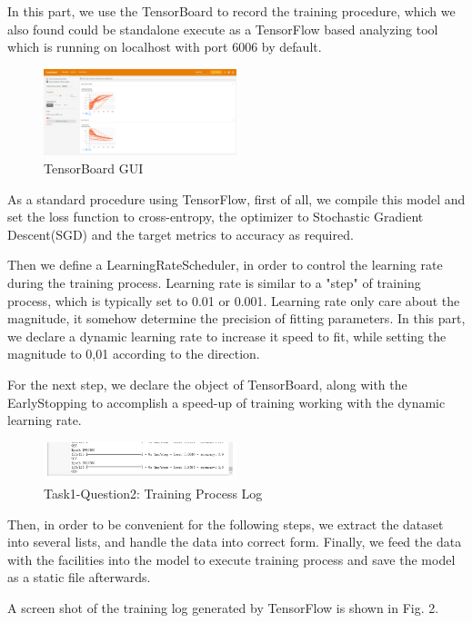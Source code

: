 \documentclass[conference]{IEEEtran}
\begin{document}
	In this part, we use the TensorBoard to record the training procedure, which we also found could be standalone execute as a TensorFlow based analyzing tool which is running on localhost with port 6006 by default.\par 
\begin{figure}[h] 
    \centering
    \includegraphics[width=0.5\textwidth]{./graphs/tb.png}
    \caption{TensorBoard GUI} 
    \label{Fig.t3q2} 
\end{figure}
	As a standard procedure using TensorFlow, first of all, we compile this model and set the loss function to cross-entropy, the optimizer to Stochastic Gradient Descent(SGD) and the target metrics to accuracy as required. \par
	Then we define a LearningRateScheduler, in order to control the learning rate during the training process. Learning rate is similar to a "step" of training process, which is typically set to 0.01 or 0.001. Learning rate only care about the magnitude, it somehow determine the precision of fitting parameters. In this part, we declare a dynamic learning rate to increase it speed to fit, while setting the magnitude to 0,01 according to the direction.\par
	For the next step, we declare the object of TensorBoard, along with the EarlyStopping to accomplish a speed-up of training working with the dynamic learning rate.
	\begin{figure}[h] 
		\centering
		\includegraphics[width=0.5\textwidth]{./graphs/T1Q2.png}
		\caption{Task1-Question2: Training Process Log} 
		\label{Fig.t1q2} 
	\end{figure}
	Then, in order to be convenient for the following steps, we extract the dataset into several lists, and handle the data into correct form. Finally, we feed the data with the facilities into the model to execute training process and save the model as a static file afterwards.\par
	A screen shot of the training log generated by TensorFlow is shown in Fig. 2.
	
\end{document}
